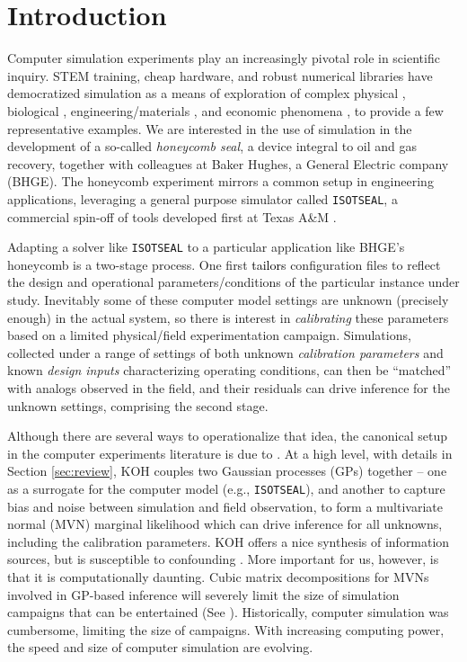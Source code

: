 \documentclass[12pt]{article}
\newcommand{\blunew}[1]{\textcolor{black}{#1}} %
\begin{document}
\section{Introduction}
\label{sec:intro}



Computer simulation experiments play an increasingly pivotal role in
scientific inquiry. STEM training, cheap hardware, and robust numerical
libraries have democratized simulation as a means of exploration of complex
physical \citep[e.g.,][]{mehta2014modeling}, biological
\citep[e.g.,][]{johnson:2008}, engineering/materials
\cite[e.g.,][]{zhang2015microstructure}, and economic phenomena
\citep[e.g.,][]{kita2016realistic}, to provide a few representative examples.
We are interested in the use of simulation in the development of a so-called
{\em honeycomb seal}, a device integral to oil and gas recovery, together with
colleagues at Baker Hughes, a General Electric company (BHGE).   The honeycomb
experiment mirrors a common setup in engineering applications, leveraging a
general purpose simulator called {\tt ISOTSEAL}, a commercial spin-off of
tools developed first at Texas A\&M \citep{isotseal}.

Adapting a solver like {\tt ISOTSEAL} to a particular
application like BHGE's honeycomb is a two-stage process.  One first
\blunew{tailors} configuration files to reflect the design and operational
parameters/conditions of the particular instance under study. Inevitably some
of these computer model settings are unknown (precisely enough) in the actual
system, so there is interest in {\em calibrating} these parameters based on a
limited physical/field experimentation campaign. Simulations, collected under
a range of settings of both unknown {\em calibration parameters} and known
{\em design inputs} characterizing operating conditions, can then be
``matched'' with analogs observed in the field, and their residuals can drive
inference for the unknown settings, comprising the second stage.

Although there are several ways to operationalize that idea, the canonical
setup in the computer experiments literature is due to \citet[][KOH
hereafter]{Kennedy:O'Hagan:2001}.  At a high level, with details in Section
\ref{sec:review}, KOH couples two Gaussian processes (GPs) together -- one as
a surrogate for the computer model (e.g., {\tt ISOTSEAL}), and another to
capture bias and noise between simulation and field observation, to form a
multivariate normal (MVN) marginal likelihood which can drive inference
for all unknowns, including the calibration parameters.  KOH offers a nice
synthesis of information sources, but is susceptible to confounding
\citep[e.g.,][]{bryn2014learning, tuo2016,plumlee2017bayesian,gu2018jointly}.
More important for us, however, is that it is computationally daunting.  Cubic
matrix decompositions for MVNs involved in GP-based inference will severely
limit the size of simulation campaigns that can be entertained 
(See \cite{Santner2018, gramacy2020surrogates}).  Historically, computer
simulation was cumbersome, limiting the size of campaigns.  
With increasing computing power, the speed and size of computer simulation are evolving. 
\end{document}
